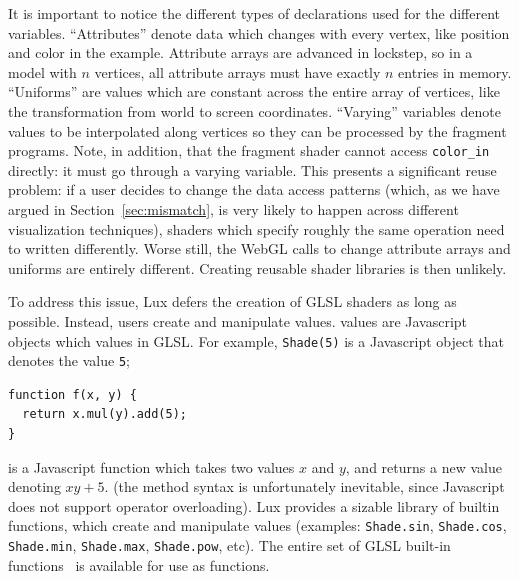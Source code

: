 It is important to notice the different types of declarations used for the different variables. 
``Attributes'' denote data which changes with every vertex, like position and color in the example. 
Attribute arrays are advanced in lockstep, so in a model with $n$ vertices, all attribute arrays must have exactly $n$ entries in memory. 
``Uniforms'' are values which are constant across the entire array of vertices, like the transformation from world to screen coordinates. 
``Varying'' variables denote values to be interpolated along vertices so they can be processed by the fragment programs. 
Note, in addition, that the fragment shader cannot access \texttt{color\_in} directly: it must go through a varying variable. 
This presents a significant reuse problem: if a user decides to change the data access patterns (which, as we have argued in Section~\ref{sec:mismatch}, is very likely to happen across different visualization techniques), shaders which specify roughly the same operation need to written differently. 
Worse still, the WebGL calls to change attribute arrays and uniforms are entirely different. 
Creating reusable shader libraries is then unlikely.

To address this issue, Lux defers the creation of GLSL shaders as long as possible. 
Instead, users create and manipulate \Shade values. \Shade values are Javascript objects which values in GLSL. 
For example, \texttt{Shade(5)} is a Javascript object that denotes the value \texttt{5};
\begin{verbatim}
function f(x, y) {
  return x.mul(y).add(5);
}
\end{verbatim}
\noindent is a Javascript function which takes two \Shade values $x$ and $y$, and returns a new \Shade value denoting $xy + 5$. (the method syntax is unfortunately inevitable, since Javascript does not support operator overloading). 
Lux provides a sizable library of builtin \Shade functions, which create and manipulate \Shade values (examples: \texttt{Shade.sin}, \texttt{Shade.cos}, \texttt{Shade.min}, \texttt{Shade.max}, \texttt{Shade.pow}, etc). 
The entire set of GLSL built-in functions~\cite{opengles-spec} is available for use as \Shade functions.

